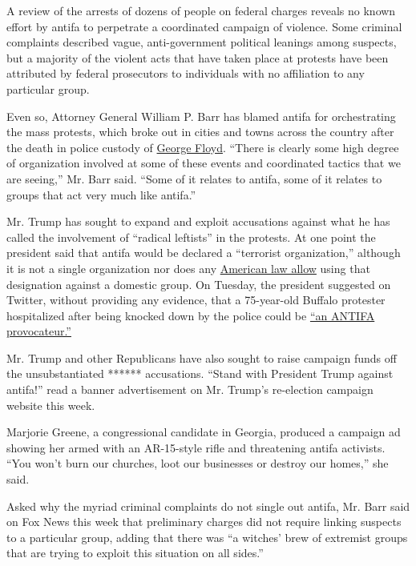 A review of the arrests of dozens of people on federal charges reveals
no known effort by antifa to perpetrate a coordinated campaign of
violence. Some criminal complaints described vague, anti-government
political leanings among suspects, but a majority of the violent acts
that have taken place at protests have been attributed by federal
prosecutors to individuals with no affiliation to any particular group.

Even so, Attorney General William P. Barr has blamed antifa for
orchestrating the mass protests, which broke out in cities and towns
across the country after the death in police custody of
\href{https://www.nytimes3xbfgragh.onion/article/george-floyd-who-is.html}{George
Floyd}. ``There is clearly some high degree of organization involved at
some of these events and coordinated tactics that we are seeing,'' Mr.
Barr said. ``Some of it relates to antifa, some of it relates to groups
that act very much like antifa.''

Mr. Trump has sought to expand and exploit accusations against what he
has called the involvement of ``radical leftists'' in the protests. At
one point the president said that antifa would be declared a ``terrorist
organization,'' although it is not a single organization nor does any
\href{https://www.nytimes3xbfgragh.onion/2020/02/25/us/domestic-terrorism-laws.html}{American
law allow} using that designation against a domestic group. On Tuesday,
the president suggested on Twitter, without providing any evidence, that
a 75-year-old Buffalo protester hospitalized after being knocked down by
the police could be
\href{https://www.nytimes3xbfgragh.onion/2020/06/09/nyregion/who-is-martin-gugino-buffalo-police.html}{``an
ANTIFA provocateur.''}

Mr. Trump and other Republicans have also sought to raise campaign funds
off the unsubstantiated ****** accusations. ``Stand with President Trump
against antifa!'' read a banner advertisement on Mr. Trump's re-election
campaign website this week.

Marjorie Greene, a congressional candidate in Georgia, produced a
campaign ad showing her armed with an AR-15-style rifle and threatening
antifa activists. ``You won't burn our churches, loot our businesses or
destroy our homes,'' she said.

Asked why the myriad criminal complaints do not single out antifa, Mr.
Barr said on Fox News this week that preliminary charges did not require
linking suspects to a particular group, adding that there was ``a
witches' brew of extremist groups that are trying to exploit this
situation on all sides.''


